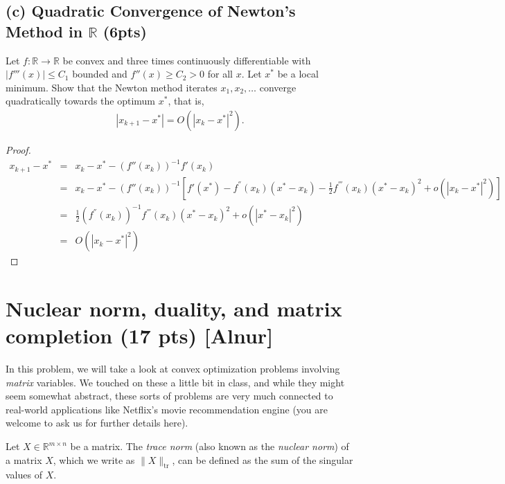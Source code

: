 \documentclass{article}
\theoremstyle{remark}
\theoremstyle{definition}
\newcommand{\reals}{\mathbb R}
\def\tr{\mathrm{tr}}
\begin{document}
\subsection*{(c) Quadratic Convergence of Newton's Method in $\reals$ (6pts)}
Let $f: \reals \rightarrow \reals$ be convex and three times continuously
differentiable with $|f'''(x)|\leq C_1$ bounded and $f''(x) \geq C_2 > 0$ for all $x$. Let $x^*$ be a local
minimum. Show that the Newton method iterates $x_1, x_2,
\dots$ converge quadratically towards the optimum $x^*$, that is,
\begin{align}
    |x_{k+1} - x^*| = O(|x_k - x^*|^2).
\end{align}
\begin{proof}
\begin{eqnarray*}
x_{k+1}-x^* &= & x_k-x^* -(f{''}(x_k))^{-1}f'(x_k)\\ 
            & = &x_k-x^* -(f{''}(x_k))^{-1}[f'(x^*)-f^{''}(x_k)(x^*-x_k)- \frac{1}{2}f^{'''}(x_k)(x^*-x_k)^2+o(|x_k-x^*|^2)]\\ 
            & = & \frac{1}{2}(f^{''}(x_k))^{-1}f^{'''}(x_k)(x^*-x_k)^2+o(|x^*-x_k|^2)\\ 
            & = & O(|x_k-x^*|^2)
\end{eqnarray*}
\end{proof}





\section{Nuclear norm, duality, and matrix completion  (17 pts) [Alnur]}

\newcommand{\symm}{\mathbb{S}}

In this problem, we will take a look at convex optimization problems involving \textit{matrix} variables.  We touched on these a little bit in class, and while they might seem somewhat abstract, these sorts of problems are very much connected to real-world applications like Netflix's movie recommendation engine (you are welcome to ask us for further details here).

Let $X \in \reals^{m \times n}$ be a matrix.  The \textit{trace norm} (also known as the \textit{nuclear norm}) of a matrix $X$, which we write as $\| X \|_{\tr}$, can be defined as the sum of the singular values of $X$.
\end{document}
